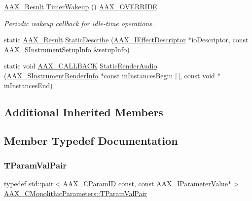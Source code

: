 \begin{DoxyCompactItemize}
\mbox{\hyperlink{a00392_a4d8f69a697df7f70c3a8e9b8ee130d2f}{A\+A\+X\+\_\+\+Result}} \mbox{\hyperlink{a01969_ac3f92841efe2d864ffefce94b7ae27b4}{Timer\+Wakeup}} () \mbox{\hyperlink{a00392_ac2f24a5172689ae684344abdcce55463}{A\+A\+X\+\_\+\+O\+V\+E\+R\+R\+I\+DE}}
\begin{DoxyCompactList}\small\item\em Periodic wakeup callback for idle-\/time operations. \end{DoxyCompactList}\item 
static \mbox{\hyperlink{a00392_a4d8f69a697df7f70c3a8e9b8ee130d2f}{A\+A\+X\+\_\+\+Result}} \mbox{\hyperlink{a01969_a69f9b80a70ecc6b7b2a7eec372d2502a}{Static\+Describe}} (\mbox{\hyperlink{a01813}{A\+A\+X\+\_\+\+I\+Effect\+Descriptor}} $\ast$io\+Descriptor, const \mbox{\hyperlink{a01957}{A\+A\+X\+\_\+\+S\+Instrument\+Setup\+Info}} \&setup\+Info)
\item 
static void \mbox{\hyperlink{a00392_aaa22112139aa627574b1ef562f579d43}{A\+A\+X\+\_\+\+C\+A\+L\+L\+B\+A\+CK}} \mbox{\hyperlink{a01969_a0384cc1e3c40ca75ffbe76b89bd12c3c}{Static\+Render\+Audio}} (\mbox{\hyperlink{a01965}{A\+A\+X\+\_\+\+S\+Instrument\+Render\+Info}} $\ast$const in\+Instances\+Begin \mbox{[}$\,$\mbox{]}, const void $\ast$in\+Instances\+End)
\end{DoxyCompactItemize}
\subsection*{Additional Inherited Members}


\subsection{Member Typedef Documentation}
\mbox{\label{a01969_ac0f3767546709abcf078503bc7dc636b}} 
\subsubsection{\texorpdfstring{TParamValPair}{TParamValPair}}
{\footnotesize\ttfamily typedef std\+::pair$<$\mbox{\hyperlink{a00392_a1440c756fe5cb158b78193b2fc1780d1}{A\+A\+X\+\_\+\+C\+Param\+ID}} const, const \mbox{\hyperlink{a01853}{A\+A\+X\+\_\+\+I\+Parameter\+Value}}$\ast$$>$ \mbox{\hyperlink{a01969_ac0f3767546709abcf078503bc7dc636b}{A\+A\+X\+\_\+\+C\+Monolithic\+Parameters\+::\+T\+Param\+Val\+Pair}}\hspace{0.3cm}{\ttfamily [protected]}}



